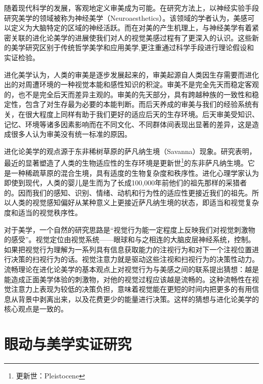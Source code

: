 随着现代科学的发展，客观地定义审美成为可能。在研究方法上，以神经实验手段研究美学的领域被称为神经美学（Neuroaesthetics）。该领域的学者认为，美感可以定义为大脑特定的区域的神经活跃。而在对美的产生机理上，与神经美学有着紧密关联的进化论美学的进展使我们对人的视觉美感过程有了更深入的认识。这些新的美学研究区别于传统哲学美学和应用美学,更注重通过科学手段进行理论假设和实证检验。

进化美学认为，人类的审美是逐步发展起来的，审美起源自人类因生存需要而进化出的对周遭环境的一种视觉本能和感性知识的积淀。审美不是完全先天而稳定客观的，也不是完全后天而差异主观的。审美的先天部分，具有跨越种族的一致性和稳定性，包含了对生存最为必要的本能判断。而后天养成的审美与我们的经验系统有关，在很大程度上同样有助于我们更好的适应后天的生存环境。后天审美受知识、记忆、环境等诸多因素影响而在不同文化、不同群体间表现出显著的差异，这是造成很多人认为审美没有统一标准的原因。

进化论美学的观点源于东非稀树草原的萨凡纳生境（Savanna）现象。研究表明，最近的显著塑造了人类的生物适应性的生存环境是更新世\footnote{更新世：Pleistocene}的东非萨凡纳生境。它是一种稀疏草原的混合生境，具有适度的生物复杂度和秩序性。进化心理学家认为即使到现代，人类的婴儿是生而为了长成100,000年前他们的祖先那样的采猎者的。因而我们的感知、识别、情绪、动机和行为性的适应性更接近我们的祖先。所以人类的视觉感知偏好从某种意义上更接近萨凡纳生境的状态，即适当和视觉复杂度和适当的视觉秩序性。

对于美学，一个自然的研究思路是“视觉行为能一定程度上反映我们对视觉刺激物的感受”。视觉定位由视觉系统——眼球和与之相连的大脑皮层神经系统，控制。如果把视觉行为理解为一系列具有信息获取能力的注视行为和对下一个注视位置进行决策的扫视行为的话。视觉注意力就是驱动这些注视和扫视行为的决策性动力。流畅理论在进化论美学的基本观点上对视觉行为与美感之间的联系提出猜想：越是能造成正面美学体验的刺激物，对他的视觉过程应该越是流畅的。这种流畅性在视觉注意力上表现为较低的决策负担，意味着视觉能在更短的时间内把更多的有用信息从背景中剥离出来，以及花费更少的能量进行决策。这样的猜想与进化论美学的核心观点是一致的。

\section{眼动与美学实证研究}

